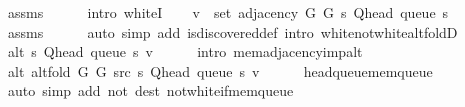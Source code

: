 \begin{isabellebody}
\ assms\isanewline
\ \ \ \ \isamarkupfalse%
\ {\isacharparenleft}{\kern0pt}intro\ whiteI{\isacharparenright}{\kern0pt}\isanewline
\ \ \isamarkupfalse%
\ {\isachardoublequoteopen}v\ {\isasymin}\ set\ {\isacharparenleft}{\kern0pt}adjacency\ G{}\ G{}\ s\ {\isacharparenleft}{\kern0pt}Q{\isacharunderscore}{\kern0pt}head\ {\isacharparenleft}{\kern0pt}queue\ s{\isacharparenright}{\kern0pt}{\isacharparenright}{\kern0pt}{\isacharparenright}{\kern0pt}{\isachardoublequoteclose}\isanewline
\ \ \ \ \isamarkupfalse%
\ assms\isanewline
\ \ \ \ \isamarkupfalse%
\ {\isacharparenleft}{\kern0pt}auto\ simp\ add{\isacharcolon}{\kern0pt}\ is{\isacharunderscore}{\kern0pt}discovered{\isacharunderscore}{\kern0pt}def\ intro{\isacharcolon}{\kern0pt}\ white{\isacharunderscore}{\kern0pt}not{\isacharunderscore}{\kern0pt}white{\isacharunderscore}{\kern0pt}alt{\isacharunderscore}{\kern0pt}foldD{\isacharparenleft}{\kern0pt}{}{\isacharparenright}{\kern0pt}{\isacharparenright}{\kern0pt}\isanewline
\ \ \isamarkupfalse%
\ {\isachardoublequoteopen}alt\ s\ {\isacharparenleft}{\kern0pt}Q{\isacharunderscore}{\kern0pt}head\ {\isacharparenleft}{\kern0pt}queue\ s{\isacharparenright}{\kern0pt}{\isacharparenright}{\kern0pt}\ v{\isachardoublequoteclose}\isanewline
\ \ \ \ \isamarkupfalse%
\ {\isacharparenleft}{\kern0pt}intro\ mem{\isacharunderscore}{\kern0pt}adjacency{\isacharunderscore}{\kern0pt}imp{\isacharunderscore}{\kern0pt}alt{\isacharparenright}{\kern0pt}\isanewline
\ \ \isamarkupfalse%
\ {\isachardoublequoteopen}alt\ {\isacharparenleft}{\kern0pt}alt{\isacharunderscore}{\kern0pt}fold\ G{}\ G{}\ src\ s{\isacharparenright}{\kern0pt}\ {\isacharparenleft}{\kern0pt}Q{\isacharunderscore}{\kern0pt}head\ {\isacharparenleft}{\kern0pt}queue\ s{\isacharparenright}{\kern0pt}{\isacharparenright}{\kern0pt}\ v{\isachardoublequoteclose}\isanewline
\ \ \ \ \isamarkupfalse%
\ head{\isacharunderscore}{\kern0pt}queue{\isacharunderscore}{\kern0pt}mem{\isacharunderscore}{\kern0pt}queue\isanewline
\ \ \ \ \isamarkupfalse%
\ {\isacharparenleft}{\kern0pt}auto\ simp\ add{\isacharcolon}{\kern0pt}\ not{\isacharunderscore}{\kern0pt}{\isacharparenleft}{\kern0pt}{}{\isacharparenright}{\kern0pt}\ dest{\isacharcolon}{\kern0pt}\ not{\isacharunderscore}{\kern0pt}white{\isacharunderscore}{\kern0pt}if{\isacharunderscore}{\kern0pt}mem{\isacharunderscore}{\kern0pt}queue{\isacharparenright}{\kern0pt}\isanewline
\ \ \isamarkupfalse%

\end{isabellebody}
